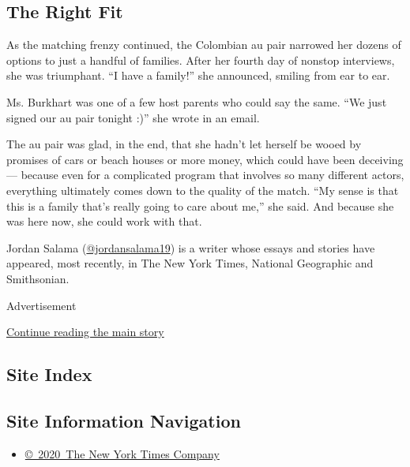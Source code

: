 \hypertarget{the-right-fit}{%
\subsection{The Right Fit}\label{the-right-fit}}

As the matching frenzy continued, the Colombian au pair narrowed her
dozens of options to just a handful of families. After her fourth day of
nonstop interviews, she was triumphant. ``I have a family!'' she
announced, smiling from ear to ear.

Ms. Burkhart was one of a few host parents who could say the same. ``We
just signed our au pair tonight :)'' she wrote in an email.

The au pair was glad, in the end, that she hadn't let herself be wooed
by promises of cars or beach houses or more money, which could have been
deceiving --- because even for a complicated program that involves so
many different actors, everything ultimately comes down to the quality
of the match. ``My sense is that this is a family that's really going to
care about me,'' she said. And because she was here now, she could work
with that.

Jordan Salama
(\href{https://twitter.com/JordanSalama19}{@jordansalama19}) is a writer
whose essays and stories have appeared, most recently, in The New York
Times, National Geographic and Smithsonian.

Advertisement

\protect\hyperlink{after-bottom}{Continue reading the main story}

\hypertarget{site-index}{%
\subsection{Site Index}\label{site-index}}

\hypertarget{site-information-navigation}{%
\subsection{Site Information
Navigation}\label{site-information-navigation}}

\begin{itemize}
\tightlist
\item
  \href{https://help.nytimes.com/hc/en-us/articles/115014792127-Copyright-notice}{©~2020~The
  New York Times Company}
\end{itemize}

